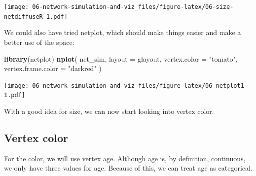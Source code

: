 \documentclass[]{book}
\newenvironment{Shaded}{\begin{snugshade}}{\end{snugshade}}
\newcommand{\CommentTok}[1]{\textcolor[rgb]{0.56,0.35,0.01}{\textit{#1}}}
\newcommand{\DataTypeTok}[1]{\textcolor[rgb]{0.13,0.29,0.53}{#1}}
\newcommand{\DecValTok}[1]{\textcolor[rgb]{0.00,0.00,0.81}{#1}}
\newcommand{\FloatTok}[1]{\textcolor[rgb]{0.00,0.00,0.81}{#1}}
\newcommand{\KeywordTok}[1]{\textcolor[rgb]{0.13,0.29,0.53}{\textbf{#1}}}
\newcommand{\NormalTok}[1]{#1}
\newcommand{\OperatorTok}[1]{\textcolor[rgb]{0.81,0.36,0.00}{\textbf{#1}}}
\newcommand{\OtherTok}[1]{\textcolor[rgb]{0.56,0.35,0.01}{#1}}
\newcommand{\StringTok}[1]{\textcolor[rgb]{0.31,0.60,0.02}{#1}}
\begin{document}
\begin{Shaded}
\end{Shaded}

\texttt{[image: 06-network-simulation-and-viz\_files/figure-latex/06-size-netdiffuseR-1.pdf]}

We could also have tried netplot, which should make things easier and make a better use of the space:

\begin{Shaded}
\begin{Highlighting}[]
\KeywordTok{library}\NormalTok{(netplot)}
\KeywordTok{nplot}\NormalTok{(}
\NormalTok{  net_sim, }\DataTypeTok{layout =}\NormalTok{ glayout,}
  \DataTypeTok{vertex.color =} \StringTok{"tomato"}\NormalTok{,}
  \DataTypeTok{vertex.frame.color =} \StringTok{"darkred"}
\NormalTok{  )}
\end{Highlighting}
\end{Shaded}

\texttt{[image: 06-network-simulation-and-viz\_files/figure-latex/06-netplot1-1.pdf]}

With a good idea for size, we can now start looking into vertex color.

\hypertarget{vertex-color}{%
\subsection{Vertex color}\label{vertex-color}}

For the color, we will use vertex age. Although age is, by definition, continuous,
we only have three values for age. Because of this, we can treat age as categorical.
\end{document}
